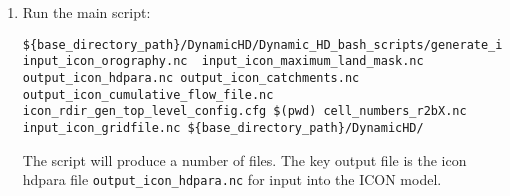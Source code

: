 \documentclass{article}
\begin{document}
\begin{enumerate}
\item Run the main script:
\begin{lstlisting}[style=bash_input,breaklines=true]
${base_directory_path}/DynamicHD/Dynamic_HD_bash_scripts/generate_icon_hdpara_top_level_driver.sh input_icon_orography.nc  input_icon_maximum_land_mask.nc  output_icon_hdpara.nc output_icon_catchments.nc output_icon_cumulative_flow_file.nc icon_rdir_gen_top_level_config.cfg $(pwd) cell_numbers_r2bX.nc input_icon_gridfile.nc ${base_directory_path}/DynamicHD/
\end{lstlisting}
The script will produce a number of files. The key output file is the icon hdpara file  \lstinline[style=bash_input]{output_icon_hdpara.nc} for input into the ICON model.%
%

\end{enumerate}
\end{document}
